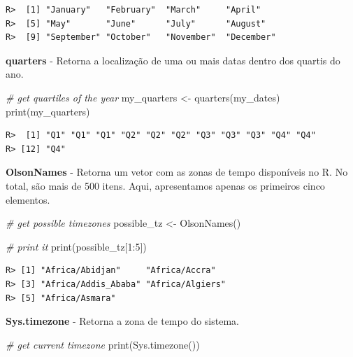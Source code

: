 \documentclass[
  11pt,
]{book}
\newenvironment{Shaded}{\begin{snugshade}}{\end{snugshade}}
\newcommand{\CommentTok}[1]{\textcolor[rgb]{0.37,0.37,0.37}{\textit{#1}}}
\newcommand{\DecValTok}[1]{\textcolor[rgb]{0.06,0.06,0.06}{#1}}
\newcommand{\FunctionTok}[1]{\textcolor[rgb]{0,0,0}{#1}}
\newcommand{\NormalTok}[1]{#1}
\newcommand{\OtherTok}[1]{\textcolor[rgb]{0.37,0.37,0.37}{#1}}
\newcommand{\SpecialCharTok}[1]{\textcolor[rgb]{0,0,0}{#1}}
\begin{document}
\begin{verbatim}
R>  [1] "January"   "February"  "March"     "April"    
R>  [5] "May"       "June"      "July"      "August"   
R>  [9] "September" "October"   "November"  "December"
\end{verbatim}

\textbf{quarters} - Retorna a localização de uma ou mais datas dentro dos quartis do ano.

\begin{Shaded}
\begin{Highlighting}[]
\CommentTok{\# get quartiles of the year}
\NormalTok{my\_quarters }\OtherTok{\textless{}{-}} \FunctionTok{quarters}\NormalTok{(my\_dates)}
\FunctionTok{print}\NormalTok{(my\_quarters)}
\end{Highlighting}
\end{Shaded}

\begin{verbatim}
R>  [1] "Q1" "Q1" "Q1" "Q2" "Q2" "Q2" "Q3" "Q3" "Q3" "Q4" "Q4"
R> [12] "Q4"
\end{verbatim}

\textbf{OlsonNames} - Retorna um vetor com as zonas de tempo disponíveis no R. No total, são mais de 500 itens. Aqui, apresentamos apenas os primeiros cinco elementos.

\begin{Shaded}
\begin{Highlighting}[]
\CommentTok{\# get possible timezones}
\NormalTok{possible\_tz }\OtherTok{\textless{}{-}} \FunctionTok{OlsonNames}\NormalTok{()}

\CommentTok{\# print it}
\FunctionTok{print}\NormalTok{(possible\_tz[}\DecValTok{1}\SpecialCharTok{:}\DecValTok{5}\NormalTok{])}
\end{Highlighting}
\end{Shaded}

\begin{verbatim}
R> [1] "Africa/Abidjan"     "Africa/Accra"      
R> [3] "Africa/Addis_Ababa" "Africa/Algiers"    
R> [5] "Africa/Asmara"
\end{verbatim}

\textbf{Sys.timezone} - Retorna a zona de tempo do sistema.

\begin{Shaded}
\begin{Highlighting}[]
\CommentTok{\# get current timezone}
\FunctionTok{print}\NormalTok{(}\FunctionTok{Sys.timezone}\NormalTok{())}
\end{Highlighting}
\end{Shaded}
\end{document}
